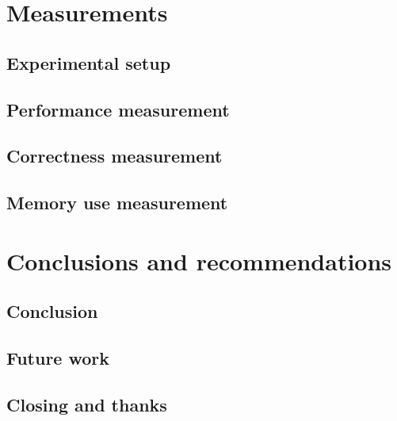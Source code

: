 \documentclass[11pt,a4paper]{report}
\begin{document}
	\chapter{Measurements}
	\label{chap:measurements}
	
	
		\section{Experimental setup}
		
		
		\section{Performance measurement}
		
		
		\section{Correctness measurement}
		
		
		\section{Memory use measurement}
		
	
	\chapter{Conclusions and recommendations}
	\label{chap:ccl}
	
	
		\section{Conclusion}
		
		
		\section{Future work}		
		

		\section{Closing and thanks}
		
	
	\printbibliography
	
	
\end{document}
